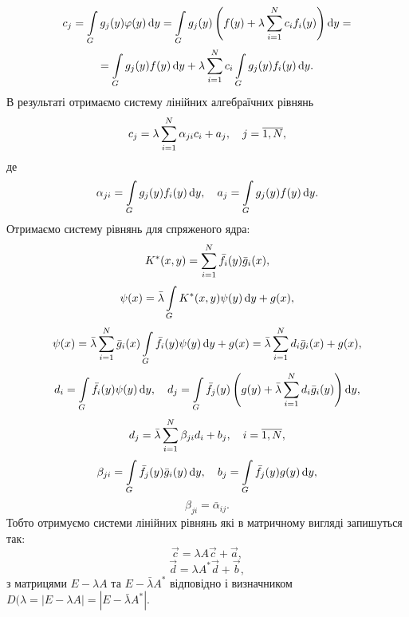 \begin{multline*}
	c_j = \displaystyle\int\limits_G g_j(y) \varphi(y) \mathop{}\!\mathrm{d} y = \displaystyle\int\limits_G g_j(y) \left( f(y) + \lambda \displaystyle\sum\limits_{i = 1}^N c_i f_i(y) \right) \mathop{}\!\mathrm{d} y = \\
	= \displaystyle\int\limits_G g_j(y) f(y) \mathop{}\!\mathrm{d} y + \lambda \displaystyle\sum\limits_{i = 1}^N c_i \displaystyle\int\limits_G g_j(y) f_i(y) \mathop{}\!\mathrm{d} y.
\end{multline*}
В результаті отримаємо систему лінійних алгебраїчних рівнянь
\begin{equation}
	\label{eq:2.5}
	c_j = \lambda \displaystyle\sum\limits_{i = 1}^N \alpha_{j i} c_i + a_j, \quad j = \overline{1, N},
\end{equation}
де 
\begin{equation}
	\label{eq:2.6}
	\alpha_{ji} = \displaystyle\int\limits_G g_j(y) f_i(y) \mathop{}\!\mathrm{d} y, \quad a_j = \displaystyle\int\limits_G g_j(y) f(y) \mathop{}\!\mathrm{d} y.
\end{equation}
Отримаємо систему рівнянь для спряженого ядра:
\begin{equation}
	\label{eq:2.1'}
	K^*(x, y) = \displaystyle\sum\limits_{i = 1}^N \bar f_i(y) \bar g_i(x),
\end{equation}
\begin{equation}
	\label{eq:2.2'}
	\psi(x) = \bar \lambda \displaystyle\int\limits_G K^*(x, y) \psi(y) \mathop{}\!\mathrm{d} y + g(x),
\end{equation}
\begin{equation}
	\label{eq:2.3'}
	\psi(x) = \bar \lambda \displaystyle\sum\limits_{i = 1}^N \bar g_i(x) \displaystyle\int\limits_G \bar f_i(y) \psi(y) \mathop{}\!\mathrm{d} y + g(x) = \bar \lambda \displaystyle\sum\limits_{i = 1}^N d_i \bar g_i(x) + g(x),
\end{equation}
\begin{equation}
	\label{eq:2.4'}
	d_i = \displaystyle\int\limits_G \bar f_i(y) \psi(y) \mathop{}\!\mathrm{d} y, \quad d_j = \displaystyle\int\limits_G \bar f_j(y) \left( g(y) + \bar \lambda \displaystyle\sum\limits_{i = 1}^N d_i \bar g_i(y) \right) \mathop{}\!\mathrm{d} y,
\end{equation}
\begin{equation}
	\label{eq:2.5'}
	d_j = \bar \lambda \displaystyle\sum\limits_{i = 1}^N \beta_{ji}d_i + b_j, \quad i = \overline{1, N}, 
\end{equation}
\begin{equation}
	\label{eq:2.6'}
	\beta_{ji} = \displaystyle\int\limits_G \bar f_j(y) \bar g_i(y) \mathop{}\!\mathrm{d} y, \quad b_j = \displaystyle\int\limits_G \bar f_j(y) g(y) \mathop{}\!\mathrm{d} y,
\end{equation}
\begin{equation}
	\label{eq:2.7}
	\beta_{ji} = \bar \alpha_{ij}.
\end{equation}
Тобто отримуємо системи лінійних рівнянь які в матричному вигляді запишуться так:
\begin{equation}
	\label{eq:2.8}
	\vec c = \lambda A \vec c + \vec a,
\end{equation}
\begin{equation}
	\label{eq:2.8'}
	\vec d = \lambda A^* \vec d + \vec b,
\end{equation}
з матрицями $E - \lambda A$ та $E - \bar \lambda A^*$ відповідно і визначником $D(\lambda = |E - \lambda A| = |E - \bar \lambda A^*|$. \\

